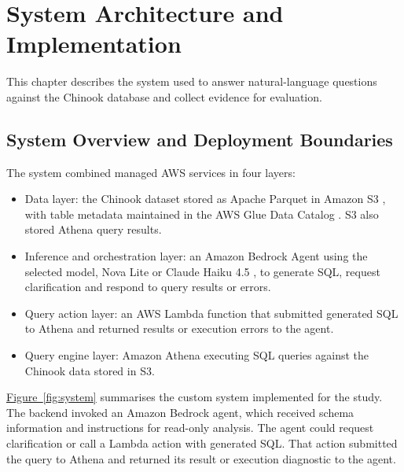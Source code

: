 \section{System Architecture and Implementation}
\label{sec:architecture}

This chapter describes the system used to answer natural-language questions
against the Chinook database and collect evidence for evaluation. 


\subsection{System Overview and Deployment Boundaries}
\label{sec:system}

The system combined managed AWS services in four layers:

\begin{itemize}
    \item Data layer: the Chinook dataset \citep{chinook} stored as
    Apache Parquet \citep{apacheParquetDocs} in Amazon S3 \citep{awsS3Docs},
    with table metadata maintained in the AWS Glue Data Catalog
    \citep{awsGlueDataCatalog}. S3 also stored Athena query results.

    \item Inference and orchestration layer: an Amazon Bedrock Agent
    \citep{awsBedrockAgents} using the selected model, Nova Lite
    \citep{awsNovaLite} or Claude Haiku 4.5 \citep{anthropicClaudeHaiku45},
    to generate SQL, request clarification and respond to query results or errors.

    \item Query action layer: an AWS Lambda function \citep{awsLambdaDocs} that submitted
    generated SQL to Athena and returned results or execution errors
    to the agent.

    \item Query engine layer: Amazon Athena \citep{awsAthena} executing SQL queries
    against the Chinook data stored in S3.
\end{itemize}

\hyperref[fig:system]{Figure~\ref*{fig:system}} summarises the custom system implemented for the study.
The backend invoked an Amazon Bedrock agent, which received schema information and instructions for
read-only analysis. The agent could request clarification or call a Lambda
action with generated SQL. That action submitted the query to Athena and
returned its result or execution diagnostic to the agent.

